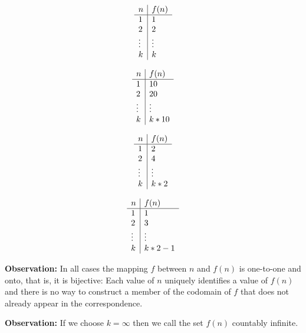 \documentclass[a4paper,blends,pdf,colorBG,slideColor]{prosper}
\begin{document}
{\scriptsize
\begin{minipage}[t]{1in}
\[
\begin{array}{l | l}
n & f(n) \\ \hline
1 & 1\\
2 & 2 \\
\vdots & \vdots\\
k & k
\end{array}
\]
\end{minipage}
\begin{minipage}[t]{1in}
\[
\begin{array}{l | l}
n & f(n) \\ \hline
1 & 10\\
2 & 20 \\
\vdots & \vdots\\
k & k*10
\end{array}
\]
\end{minipage}
\begin{minipage}[t]{1in}
\[
\begin{array}{l | l}
n & f(n) \\ \hline
1 & 2\\
2 & 4 \\
\vdots & \vdots\\
k & k*2
\end{array}
\]
\end{minipage}
\begin{minipage}[t]{1in}
\[
\begin{array}{l | l}
n & f(n) \\ \hline
1 & 1\\
2 & 3 \\
\vdots & \vdots\\
k & k*2 - 1
\end{array}
\]
\end{minipage}
}



{\bf Observation:} In all cases the mapping $f$ between $n$ and $f(n)$ is one-to-one
and onto, that is, it is bijective: Each value of $n$ uniquely identifies a value of $f(n)$ and there is no way to construct a member of the codomain
of $f$ that does not already appear in the correspondence.

{\bf Observation:}  If we choose $k=\infty$ then we call the set $f(n)$ countably infinite.
\es
\end{document}
